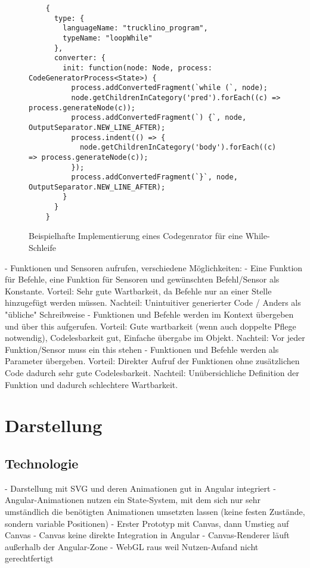 \begin{figure}[h]
  \begin{lstlisting}
    {
      type: {
        languageName: "trucklino_program",
        typeName: "loopWhile"
      },
      converter: {
        init: function(node: Node, process: CodeGeneratorProcess<State>) {
          process.addConvertedFragment(`while (`, node);
          node.getChildrenInCategory('pred').forEach((c) => process.generateNode(c));
          process.addConvertedFragment(`) {`, node, OutputSeparator.NEW_LINE_AFTER);
          process.indent(() => {
            node.getChildrenInCategory('body').forEach((c) => process.generateNode(c));
          });
          process.addConvertedFragment(`}`, node, OutputSeparator.NEW_LINE_AFTER);
        }
      }
    }
  \end{lstlisting}
  \caption{Beispielhafte Implementierung eines Codegenrator für eine While-Schleife}
  \label{fig:implementation:program:evaluation:while}
\end{figure}

- Funktionen und Sensoren aufrufen, verschiedene Möglichkeiten:
    - Eine Funktion für Befehle, eine Funktion für Sensoren und gewünschten Befehl/Sensor als Konstante. Vorteil: Sehr gute Wartbarkeit, da Befehle nur an einer Stelle hinzugefügt werden müssen. Nachteil: Unintuitiver generierter Code / Anders als "übliche" Schreibweise
    - Funktionen und Befehle werden im Kontext übergeben und über this aufgerufen. Vorteil: Gute wartbarkeit (wenn auch doppelte Pflege notwendig), Codelesbarkeit gut, Einfache übergabe im Objekt. Nachteil: Vor jeder Funktion/Sensor muss ein this stehen
    - Funktionen und Befehle werden als Parameter übergeben. Vorteil: Direkter Aufruf der Funktionen ohne zusätzlichen Code dadurch sehr gute Codelesbarkeit. Nachteil: Unübersichliche Definition der Funktion und dadurch schlechtere Wartbarkeit.

\section{Darstellung}

\subsection{Technologie}

- Darstellung mit SVG und deren Animationen gut in Angular integriert
- Angular-Animationen nutzen ein State-System, mit dem sich nur sehr umständlich
  die benötigten Animationen umsetzten lassen (keine festen Zustände, sondern
  variable Positionen)
- Erster Prototyp mit Canvas, dann Umstieg auf Canvas
- Canvas keine direkte Integration in Angular
- Canvas-Renderer läuft außerhalb der Angular-Zone
- WebGL raus weil Nutzen-Aufand nicht gerechtfertigt

